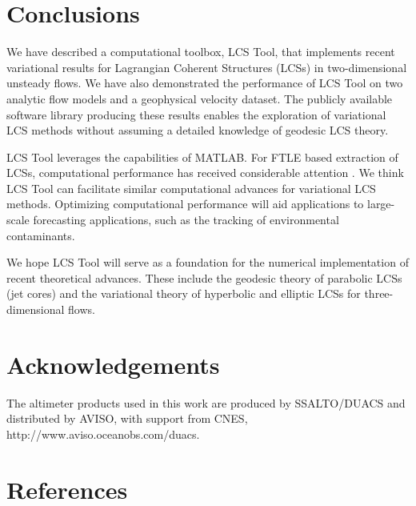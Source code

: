 \documentclass{elsarticle}
\begin{document}
\section{Conclusions}

We have described a computational toolbox, LCS Tool, that implements recent variational results for Lagrangian Coherent Structures (LCSs) in two-dimensional unsteady flows. We have also demonstrated the performance of LCS Tool on two analytic flow models and a geophysical velocity dataset. The publicly available software library producing these results enables the exploration of variational LCS methods without assuming a detailed knowledge of geodesic LCS theory.

LCS Tool leverages the capabilities of MATLAB. For FTLE based extraction of LCSs, computational performance has received considerable attention \citep{conti12:_gpu_apu_finit_time_lyapun_expon,miron12:_anisot_lagran_coher_struc}.
We think LCS Tool can facilitate similar computational advances for variational LCS methods.
Optimizing computational performance will aid applications to large-scale forecasting applications, such as the tracking of environmental contaminants\citep{olascoaga12:_forec}.

We hope LCS Tool will serve as a foundation for the numerical implementation of recent theoretical advances.
These include the geodesic theory of parabolic LCSs (jet cores)\citep{farazmand14:_shearless} and the variational theory of hyperbolic and elliptic LCSs for three-dimensional flows\citep{blazevski14:_hyper_ellip_trans_barrier_three}.

\section*{Acknowledgements}

The altimeter products used in this work are produced by SSALTO/DUACS and distributed by AVISO, with support from CNES, http://www.aviso.oceanobs.com/duacs.

\section*{References}

 

\end{document}

